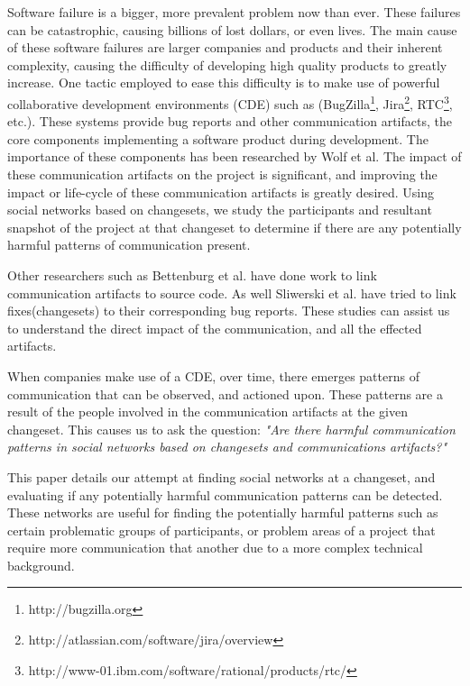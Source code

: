 \documentclass[conference]{IEEEtran}
\begin{document}
Software failure is a bigger, more prevalent problem now than ever.  These failures can be catastrophic, causing billions of lost dollars, or even lives.  The main cause of these software failures are larger companies and products and their inherent complexity, causing the difficulty of developing high quality products to greatly increase.  One tactic employed to ease this difficulty is to make use of powerful collaborative development environments (CDE) such as (BugZilla\footnote{http://bugzilla.org}, Jira\footnote{http://atlassian.com/software/jira/overview}, RTC\footnote{http://www-01.ibm.com/software/rational/products/rtc/}, etc.).  These systems provide bug reports and other communication artifacts, the core components implementing a software product during development.  The importance of these components has been researched by Wolf et al\cite{4721184}.  The impact of these communication artifacts on the project is significant, and improving the impact or life-cycle of these communication artifacts is greatly desired.  Using social networks based on changesets, we study the participants and resultant snapshot of the project at that changeset to determine if there are any potentially harmful patterns of communication present.  

Other researchers such as Bettenburg et al\cite{Bettenburg:2008:ESI:1370750.1370757}. have done work to link communication artifacts to source code.  As well Sliwerski et al\cite{Sliwerski:2005:CIF:1083142.1083147}. have tried to link fixes(changesets) to their corresponding bug reports.  These studies can assist us to understand the direct impact of the communication, and all the effected artifacts.  

When companies make use of a CDE, over time, there emerges patterns of communication that can be observed, and actioned upon.  These patterns are a result of the people involved in the communication artifacts at the given changeset.   This causes us to ask the question: \textit{"Are there harmful communication patterns in social networks based on changesets and communications artifacts?"}  

This paper details our attempt at finding social networks at a changeset, and evaluating if any potentially harmful communication patterns can be detected.  These networks are useful for finding the potentially harmful patterns such as certain problematic groups of participants, or problem areas of a project that require more communication that another due to a more complex technical background. 
\end{document}
